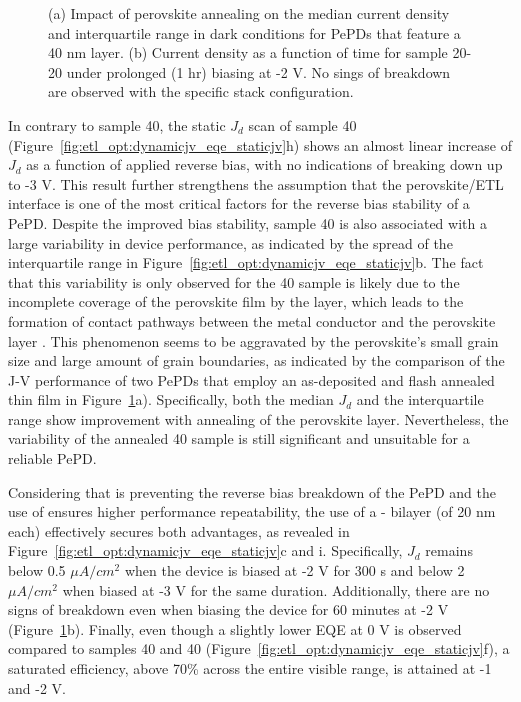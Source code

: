 \begin{figure}[htbp]
    \caption{(a) Impact of perovskite annealing on the median current density and interquartile range in dark conditions for PePDs that feature a 40 nm  layer. (b) Current density as a function of time for sample 20-20 under prolonged (1 hr) biasing at -2 V. No sings of breakdown are observed with the specific stack configuration.}   \label{fig:et_optim:c60_variability_and_1hr_stability}
\end{figure}

In contrary to sample 40, the static $J_d$ scan of sample 40 (Figure~\ref{fig:etl_opt:dynamicjv_eqe_staticjv}h) shows an almost linear increase of $J_d$ as a function of applied reverse bias, with no indications of breaking down up to -3 V. This result further strengthens the assumption that the perovskite/ETL interface is one of the most critical factors for the reverse bias stability of a PePD. Despite the improved bias stability, sample 40 is also associated with a large variability in device performance, as indicated by the spread of the interquartile range in Figure~\ref{fig:etl_opt:dynamicjv_eqe_staticjv}b. The fact that this variability is only observed for the 40 sample is likely due to the incomplete coverage of the perovskite film by the  layer, which leads to the formation of contact pathways between the metal conductor and the perovskite layer \cite{Lin2015LowImaging, Younes2021EnhancingLayer}. This phenomenon seems to be aggravated by the perovskite's small grain size and large amount of grain boundaries, as indicated by the comparison of the J-V performance of two PePDs that employ an as-deposited and flash annealed  thin film in Figure~\ref{fig:et_optim:c60_variability_and_1hr_stability}a). Specifically, both the median $J_d$ and the interquartile range show improvement with annealing of the perovskite layer. Nevertheless, the variability of the annealed 40 sample is still significant and unsuitable for a reliable PePD. 




Considering that  is preventing the reverse bias breakdown of the PePD and the use of  ensures higher performance repeatability, the use of a - bilayer (of 20 nm each) effectively secures both advantages, as revealed in Figure~\ref{fig:etl_opt:dynamicjv_eqe_staticjv}c and i. Specifically, $J_d$ remains below 0.5 $\mu A/cm^2$ when the device is biased at -2 V for 300 s and below 2 $\mu A/cm^2$ when biased at -3 V for the same duration. Additionally, there are no signs of breakdown even when biasing the device for 60 minutes at -2 V (Figure~\ref{fig:et_optim:c60_variability_and_1hr_stability}b). Finally, even though a slightly lower EQE at 0 V is observed compared to samples 40 and 40 (Figure~\ref{fig:etl_opt:dynamicjv_eqe_staticjv}f), a saturated efficiency, above 70\% across the entire visible range, is attained at -1 and -2 V. 

